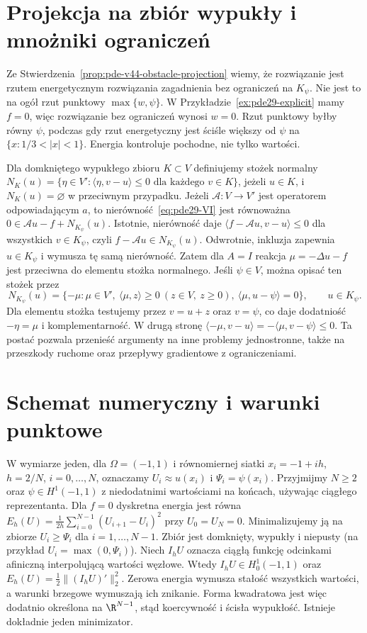 \section{Projekcja na zbiór wypukły i mnożniki ograniczeń}
Ze Stwierdzenia~\ref{prop:pde-v44-obstacle-projection}
wiemy, że rozwiązanie jest rzutem energetycznym
rozwiązania zagadnienia bez ograniczeń na $K_\psi$.
Nie jest to na ogół rzut punktowy $\max\{w,\psi\}$.
W Przykładzie~\ref{ex:pde29-explicit} mamy $f=0$,
więc rozwiązanie bez ograniczeń wynosi $w=0$.
Rzut punktowy byłby równy $\psi$, podczas gdy
rzut energetyczny jest ściśle większy od $\psi$
na $\{x:1/3<|x|<1\}$.
Energia kontroluje pochodne, nie tylko wartości.

Dla domkniętego wypukłego zbioru $K\subset V$ definiujemy
stożek normalny
$N_K(u)=\{\eta\in V':\langle\eta,v-u\rangle\le0
\text{ dla każdego }v\in K\}$, jeżeli $u\in K$,
i $N_K(u)=\varnothing$ w przeciwnym przypadku.
Jeżeli $\mathcal A:V\to V'$ jest operatorem odpowiadającym $a$,
to nierówność~\eqref{eq:pde29-VI} jest równoważna
$0\in\mathcal Au-f+N_{K_\psi}(u)$.
Istotnie, nierówność daje
$\langle f-\mathcal Au,v-u\rangle\le0$
dla wszystkich $v\in K_\psi$, czyli
$f-\mathcal Au\in N_{K_\psi}(u)$.
Odwrotnie, inkluzja zapewnia $u\in K_\psi$
i wymusza tę samą nierówność.
Zatem dla $A=I$ reakcja $\mu=-\Delta u-f$
jest przeciwna do elementu stożka normalnego.
Jeśli $\psi\in V$, można opisać ten stożek przez
\[
 N_{K_\psi}(u)=\{-\mu:\mu\in V',
 \ \langle\mu,z\rangle\ge0\ (z\in V,\ z\ge0),
 \ \langle\mu,u-\psi\rangle=0\},\qquad u\in K_\psi.
\]
Dla elementu stożka testujemy przez $v=u+z$
oraz $v=\psi$, co daje dodatniość $-\eta=\mu$
i komplementarność. W drugą stronę
$\langle-\mu,v-u\rangle=-\langle\mu,v-\psi\rangle\le0$.
Ta postać pozwala przenieść argumenty na inne problemy
jednostronne, także na przeszkody ruchome oraz przepływy
gradientowe z ograniczeniami.

\section{Schemat numeryczny i warunki punktowe}
W wymiarze jeden, dla $\Omega=(-1,1)$ i równomiernej siatki
$x_i=-1+ih$, $h=2/N$, $i=0,\ldots,N$, oznaczamy
$U_i\approx u(x_i)$ i $\Psi_i=\psi(x_i)$.
Przyjmijmy $N\ge2$ oraz $\psi\in H^1(-1,1)$
z niedodatnimi wartościami na końcach, używając
ciągłego reprezentanta. Dla $f=0$ dyskretna energia jest równa
$E_h(U)=\frac1{2h}\sum_{i=0}^{N-1}(U_{i+1}-U_i)^2$
przy $U_0=U_N=0$. Minimalizujemy ją na zbiorze
$U_i\ge\Psi_i$ dla $i=1,\dots,N-1$.
Zbiór jest domknięty, wypukły i niepusty
(na przykład $U_i=\max(0,\Psi_i)$).
Niech $I_hU$ oznacza ciągłą funkcję odcinkami
afiniczną interpolującą wartości węzłowe.
Wtedy $I_hU\in H_0^1(-1,1)$ oraz
$E_h(U)=\tfrac12\|(I_hU)'\|_2^2$.
Zerowa energia wymusza stałość wszystkich wartości,
a warunki brzegowe wymuszają ich znikanie.
Forma kwadratowa jest więc dodatnio określona
na $\R^{N-1}$, stąd koercywność i ścisła wypukłość.
Istnieje dokładnie jeden minimizator.

